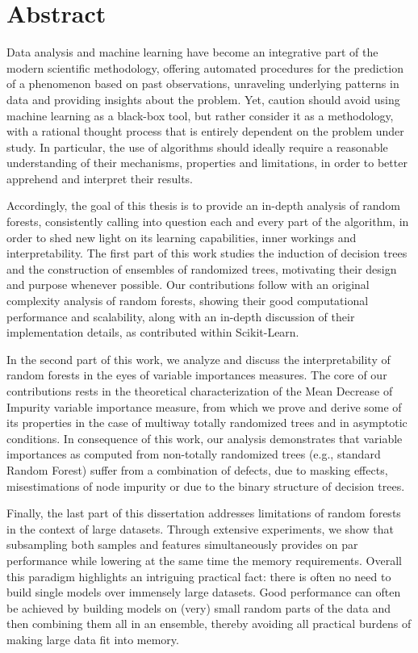 
\chapter*{Abstract}

Data analysis and machine learning have become an integrative part of the
modern scientific methodology, offering automated procedures for the prediction
of a phenomenon based on past observations, unraveling underlying patterns in
data and providing insights about the problem. Yet, caution should
avoid using machine learning as a black-box tool, but rather consider it as a
methodology, with a rational thought process that is entirely dependent on the
problem under study. In particular, the use of algorithms
should ideally require a reasonable understanding of their
mechanisms, properties and limitations, in order to better apprehend and
interpret their results.

Accordingly, the goal of this thesis is to provide an in-depth
analysis of random forests, consistently calling into
question each and every part of the algorithm, in order to shed new light on
its learning capabilities, inner workings and interpretability. The first
part of this work studies the induction of decision trees and the construction of
ensembles of randomized trees, motivating their design and purpose whenever
possible. Our contributions follow with an original complexity
analysis of random forests, showing their good computational performance
and scalability, along with an in-depth discussion of their
implementation details, as contributed within Scikit-Learn.

In the second part of this work, we analyze and discuss the interpretability of
random forests in the eyes of variable importances measures. The core of our
contributions rests in the theoretical characterization of the Mean Decrease of
Impurity variable importance measure, from which we prove and derive some of
its properties in the case of multiway totally randomized trees and in
asymptotic conditions. In consequence of this work, our analysis  demonstrates
that variable importances as computed from non-totally randomized trees (e.g.,
standard Random Forest) suffer from a combination of defects, due to masking
effects, misestimations of node impurity or due to the binary structure of
decision trees.

Finally, the last part of this dissertation addresses limitations of random forests
in the context of large datasets. Through extensive experiments, we show
that subsampling both samples and features simultaneously provides on
par performance while lowering at the same time the memory requirements.
Overall this paradigm highlights an intriguing practical fact: there is often
no need to build single models over immensely large datasets. Good performance
can often be achieved by building models on (very) small random parts of the
data and then combining them all in an ensemble, thereby avoiding all practical burdens of making large data fit into memory.
